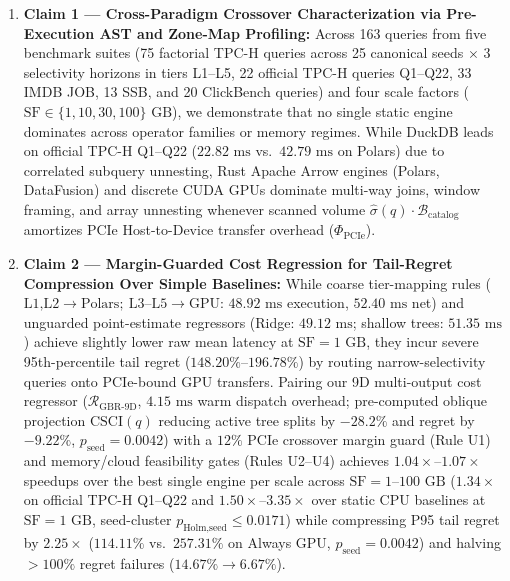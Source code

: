 \documentclass[10pt,a4paper]{article}
\begin{document}
\begin{enumerate}[leftmargin=1.5em,itemsep=4pt]
    \item \textbf{Claim 1 --- Cross-Paradigm Crossover Characterization via Pre-Execution AST and Zone-Map Profiling:} Across 163 queries from five benchmark suites (75 factorial TPC-H queries across 25 canonical seeds $\times$ 3 selectivity horizons in tiers L1--L5, 22 official TPC-H queries Q1--Q22, 33 IMDB JOB, 13 SSB, and 20 ClickBench queries) and four scale factors ($\text{SF}\in\{1,10,30,100\}\text{ GB}$), we demonstrate that no single static engine dominates across operator families or memory regimes. While DuckDB leads on official TPC-H Q1--Q22 ($22.82\text{ ms}$ vs.\ $42.79\text{ ms}$ on Polars) due to correlated subquery unnesting, Rust Apache Arrow engines (Polars, DataFusion) and discrete CUDA GPUs dominate multi-way joins, window framing, and array unnesting whenever scanned volume $\hat{\sigma}(q)\cdot\mathcal{B}_{\text{catalog}}$ amortizes PCIe Host-to-Device transfer overhead ($\Phi_{\text{PCIe}}$).
    \item \textbf{Claim 2 --- Margin-Guarded Cost Regression for Tail-Regret Compression Over Simple Baselines:} While coarse tier-mapping rules ($\text{L1,L2}\rightarrow\text{Polars};\ \text{L3--L5}\rightarrow\text{GPU}$: $48.92\text{ ms}$ execution, $52.40\text{ ms}$ net) and unguarded point-estimate regressors (Ridge: $49.12\text{ ms}$; shallow trees: $51.35\text{ ms}$) achieve slightly lower raw mean latency at $\text{SF}=1\text{ GB}$, they incur severe 95th-percentile tail regret ($148.20\%\text{--}196.78\%$) by routing narrow-selectivity queries onto PCIe-bound GPU transfers. Pairing our 9D multi-output cost regressor ($\mathcal{R}_{\text{GBR-9D}}$, $4.15\text{ ms}$ warm dispatch overhead; pre-computed oblique projection $\text{CSCI}(q)$ reducing active tree splits by $-28.2\%$ and regret by $-9.22\%$, $p_{\text{seed}}=0.0042$) with a $12\%$ PCIe crossover margin guard (Rule U1) and memory/cloud feasibility gates (Rules U2--U4) achieves $1.04\times\text{--}1.07\times$ speedups over the best single engine per scale across $\text{SF}=1\text{--}100\text{ GB}$ ($1.34\times$ on official TPC-H Q1--Q22 and $1.50\times\text{--}3.35\times$ over static CPU baselines at $\text{SF}=1\text{ GB}$, seed-cluster $p_{\text{Holm,seed}}\le 0.0171$) while compressing P95 tail regret by $2.25\times$ ($114.11\%$ vs.\ $257.31\%$ on Always GPU, $p_{\text{seed}}=0.0042$) and halving $>100\%$ regret failures ($14.67\%\rightarrow 6.67\%$).

\end{enumerate}
\end{document}
